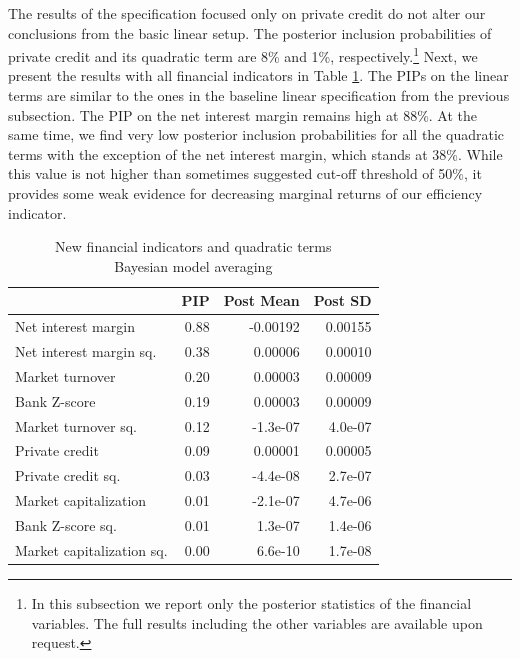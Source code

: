 The results of the specification focused only on private credit do not alter our conclusions from the basic linear setup. The posterior inclusion probabilities of private credit and its quadratic term are 8\% and 1\%, respectively.\footnote{In this subsection we report only the posterior statistics of the financial variables. The full results including the other variables are available upon request.} Next, we present the results with all financial indicators in Table \ref{ch2fig:BMAquad}. The \acp{PIP} on the linear terms are similar to the ones in the baseline linear specification from the previous subsection. The \ac{PIP} on the net interest margin remains high at 88\%. At the same time, we find very low posterior inclusion probabilities for all the quadratic terms with the exception of the net interest margin, which stands at 38\%. While this value is not higher than sometimes suggested cut-off threshold of 50\%, it provides some weak evidence for decreasing marginal returns of our efficiency indicator. 

\begin{table}[!htbp]
	\centering
	\caption{New financial indicators and quadratic terms\\
		Bayesian model averaging}
		\label{ch2fig:BMAquad}
	\small
	\begin{tabular}{lrrr}
		\toprule
		& PIP & Post Mean & Post SD \\ 
		\midrule
		  Net interest margin & 0.88 & -0.00192 & 0.00155\\ 
		  Net interest margin sq. & 0.38 & 0.00006 & 0.00010\\ 
		  Market turnover & 0.20 & 0.00003 & 0.00009\\ 
		  Bank Z-score & 0.19 & 0.00003 & 0.00009\\ 
		  Market turnover sq. & 0.12 & -1.3e-07 & 4.0e-07 \\ 
		  Private credit & 0.09 & 0.00001 & 0.00005\\ 
		  Private credit sq. & 0.03 & -4.4e-08 & 2.7e-07 \\ 
		  Market capitalization & 0.01 & -2.1e-07 & 4.7e-06 \\ 
		  Bank Z-score sq. & 0.01 & 1.3e-07 & 1.4e-06 \\ 
		  Market capitalization sq. & 0.00 & 6.6e-10 & 1.7e-08 \\
		\bottomrule
	\end{tabular}
\end{table}

